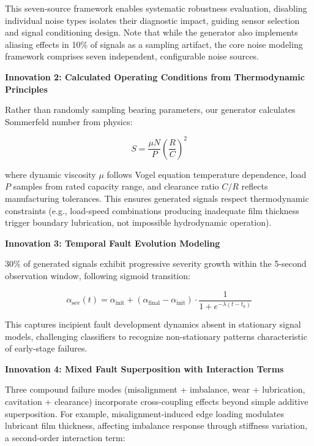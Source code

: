 \documentclass[11pt,a4paper]{article}
\begin{document}
This seven-source framework enables systematic robustness evaluation, disabling individual noise types isolates their diagnostic impact, guiding sensor selection and signal conditioning design. Note that while the generator also implements aliasing effects in 10\% of signals as a sampling artifact, the core noise modeling framework comprises seven independent, configurable noise sources.

\textbf{Innovation 2: Calculated Operating Conditions from Thermodynamic Principles}

Rather than randomly sampling bearing parameters, our generator calculates Sommerfeld number from physics:

\begin{equation}
S = \frac{\mu N}{P} \left(\frac{R}{C}\right)^2
\end{equation}

where dynamic viscosity $\mu$ follows Vogel equation temperature dependence, load $P$ samples from rated capacity range, and clearance ratio $C/R$ reflects manufacturing tolerances. This ensures generated signals respect thermodynamic constraints (e.g., load-speed combinations producing inadequate film thickness trigger boundary lubrication, not impossible hydrodynamic operation).

\textbf{Innovation 3: Temporal Fault Evolution Modeling}

30\% of generated signals exhibit progressive severity growth within the 5-second observation window, following sigmoid transition:

\begin{equation}
\alpha_{\text{sev}}(t) = \alpha_{\text{init}} + (\alpha_{\text{final}} - \alpha_{\text{init}}) \cdot \frac{1}{1 + e^{-\lambda(t - t_0)}}
\end{equation}

This captures incipient fault development dynamics absent in stationary signal models, challenging classifiers to recognize non-stationary patterns characteristic of early-stage failures.

\textbf{Innovation 4: Mixed Fault Superposition with Interaction Terms}

Three compound failure modes (misalignment + imbalance, wear + lubrication, cavitation + clearance) incorporate cross-coupling effects beyond simple additive superposition. For example, misalignment-induced edge loading modulates lubricant film thickness, affecting imbalance response through stiffness variation, a second-order interaction term:
\end{document}
